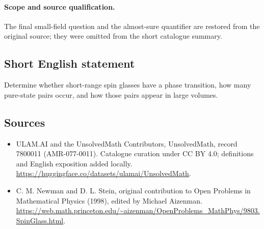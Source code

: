 \documentclass[11pt]{article}
\begin{document}
\paragraph{Scope and source qualification.}The final small-field question and the almost-sure quantifier are restored from the original source; they were omitted from the short catalogue summary.
\subsection{Short English statement}
Determine whether short-range spin glasses have a phase transition, how many pure-state pairs occur, and how those pairs appear in large volumes.
\subsection{Sources}
\begin{itemize}
\item[\hypertarget{source:7800011:1}{S1}] ULAM.AI and the UnsolvedMath Contributors, UnsolvedMath, record 7800011 (AMR-077-0011). Catalogue curation under CC BY 4.0; definitions and English exposition added locally.
\url{https://huggingface.co/datasets/ulamai/UnsolvedMath}.
\item[\hypertarget{source:7800011:2}{S2}] C. M. Newman and D. L. Stein, original contribution to Open Problems in Mathematical Physics (1998), edited by Michael Aizenman.
\url{https://web.math.princeton.edu/~aizenman/OpenProblems_MathPhys/9803.SpinGlass.html}.
\end{itemize}
\label{end:7800011}
\end{document}
